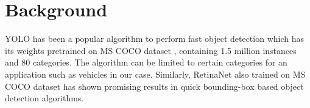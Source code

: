 \chapter{Background}
\label{chap:background}

YOLO \parencite{redmon2018yolov3} has been a popular algorithm to perform fast object detection which has its weights pretrained on MS COCO dataset \parencite{lin2014microsoftCOCO}, containing 1.5 million instances and 80 categories. The algorithm can be limited to certain categories for an application such as vehicles in our case. Similarly, RetinaNet \parencite{lin2017focalRetinaNet} also trained on MS COCO dataset has shown promising results in quick bounding-box based object detection algorithms.







